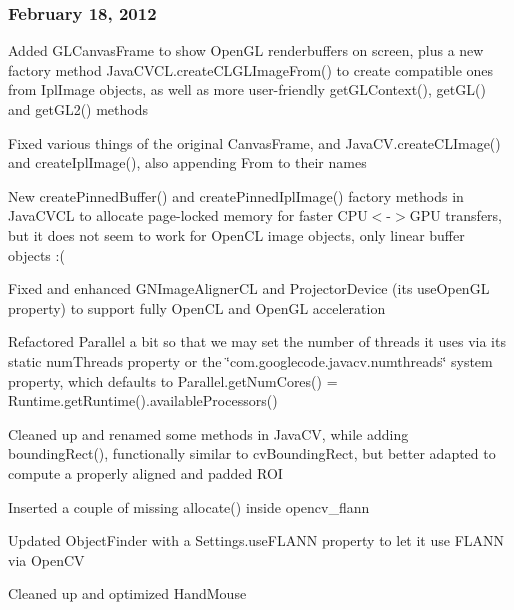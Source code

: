 \subsubsection*{February 18, 2012}


\begin{DoxyItemize}
\item Added {\ttfamily G\+L\+Canvas\+Frame} to show Open\+G\+L renderbuffers on screen, plus a new factory method {\ttfamily Java\+C\+V\+C\+L.\+create\+C\+L\+G\+L\+Image\+From()} to create compatible ones from {\ttfamily Ipl\+Image} objects, as well as more user-\/friendly {\ttfamily get\+G\+L\+Context()}, {\ttfamily get\+G\+L()} and {\ttfamily get\+G\+L2()} methods
\item Fixed various things of the original {\ttfamily Canvas\+Frame}, and {\ttfamily Java\+C\+V.\+create\+C\+L\+Image()} and {\ttfamily create\+Ipl\+Image()}, also appending {\ttfamily From} to their names
\item New {\ttfamily create\+Pinned\+Buffer()} and {\ttfamily create\+Pinned\+Ipl\+Image()} factory methods in {\ttfamily Java\+C\+V\+C\+L} to allocate page-\/locked memory for faster C\+P\+U$<$-\/$>$G\+P\+U transfers, but it does not seem to work for Open\+C\+L image objects, only linear buffer objects \+:(
\item Fixed and enhanced {\ttfamily G\+N\+Image\+Aligner\+C\+L} and {\ttfamily Projector\+Device} (its {\ttfamily use\+Open\+G\+L} property) to support fully Open\+C\+L and Open\+G\+L acceleration
\item Refactored {\ttfamily Parallel} a bit so that we may set the number of threads it uses via its static {\ttfamily num\+Threads} property or the \char`\"{}com.\+googlecode.\+javacv.\+numthreads\char`\"{} system property, which defaults to {\ttfamily Parallel.\+get\+Num\+Cores() = Runtime.\+get\+Runtime().available\+Processors()}
\item Cleaned up and renamed some methods in {\ttfamily Java\+C\+V}, while adding {\ttfamily bounding\+Rect()}, functionally similar to {\ttfamily cv\+Bounding\+Rect}, but better adapted to compute a properly aligned and padded R\+O\+I
\item Inserted a couple of missing {\ttfamily allocate()} inside {\ttfamily opencv\+\_\+flann}
\item Updated {\ttfamily Object\+Finder} with a {\ttfamily Settings.\+use\+F\+L\+A\+N\+N} property to let it use F\+L\+A\+N\+N via Open\+C\+V
\item Cleaned up and optimized {\ttfamily Hand\+Mouse}

\end{DoxyItemize}
